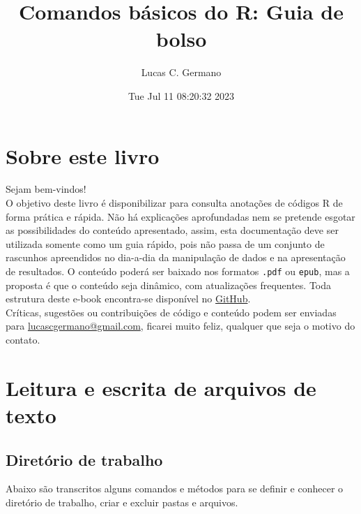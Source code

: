 \documentclass[
]{book}
\title{Comandos básicos do R: Guia de bolso}
\author{Lucas C. Germano}
\date{Tue Jul 11 08:20:32 2023}
\theoremstyle{definition}
\theoremstyle{definition}
\theoremstyle{definition}
\theoremstyle{definition}
\theoremstyle{remark}
\begin{document}
\maketitle

{
\setcounter{tocdepth}{1}
\tableofcontents
}
\hypertarget{sobre-este-livro}{%
\chapter*{Sobre este livro}\label{sobre-este-livro}}

Sejam bem-vindos!\\
O objetivo deste livro é disponibilizar para consulta anotações de códigos R de forma prática e rápida. Não há explicações aprofundadas nem se pretende esgotar as possibilidades do conteúdo apresentado, assim, esta documentação deve ser utilizada somente como um guia rápido, pois não passa de um conjunto de rascunhos apreendidos no dia-a-dia da manipulação de dados e na apresentação de resultados. O conteúdo poderá ser baixado nos formatos \texttt{.pdf} ou \texttt{epub}, mas a proposta é que o conteúdo seja dinâmico, com atualizações frequentes. Toda estrutura deste e-book encontra-se disponível no \href{https://github.com/lucascgmermano/guia_de_bolso.git}{GitHub}.\\
Críticas, sugestões ou contribuições de código e conteúdo podem ser enviadas para \url{lucascgermano@gmail.com}, ficarei muito feliz, qualquer que seja o motivo do contato.

\hypertarget{leitura-e-escrita-de-arquivos-de-texto}{%
\chapter{Leitura e escrita de arquivos de texto}\label{leitura-e-escrita-de-arquivos-de-texto}}

\hypertarget{diretuxf3rio-de-trabalho}{%
\section{Diretório de trabalho}\label{diretuxf3rio-de-trabalho}}

Abaixo são transcritos alguns comandos e métodos para se definir e conhecer o diretório de trabalho, criar e excluir pastas e arquivos.
\end{document}

